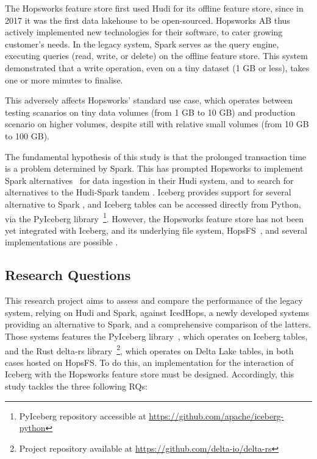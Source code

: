 The Hopsworks feature store \cite{10.1145/3626246.3653389} first used Hudi for its offline feature store, since in 2017 it was the first data lakehouse to be open-sourced. Hopsworks AB thus actively implemented new technologies for their software, to cater growing customer's needs. In the legacy system, Spark serves as the query engine, executing queries (read, write, or delete) on the offline feature store. This system demonstrated that a write operation, even on a tiny dataset (1 GB or less), takes one or more minutes to finalise.

This adversely affects Hopsworks' standard use case, which operates between testing scanarios on tiny data volumes (from 1 GB to 10 GB) and production scenario on higher volumes, despite still with relative small volumes (from 10 GB to 100 GB).

The fundamental hypothesis of this study is that the prolonged transaction time is a problem determined by Spark. This has prompted Hopsworks to implement Spark alternatives~\cite{Khazanchi1801362} for data ingestion in their Hudi system, and to search for alternatives to the Hudi-Spark tandem \cite{manfrediReducingReadWrite2024}.
Iceberg provides support for several alternative to Spark \cite{OngoingEvolutionTableFormat}, and Iceberg tables can be accessed directly from Python, via the PyIceberg library~\footnote{PyIceberg repository accessible at \url{https://github.com/apache/iceberg-python}}.
However, the Hopsworks feature store has not been yet integrated with Iceberg, and its underlying file system, \gls{HopsFS}~\cite{niaziHopsFSScalingHierarchical2017}, and several implementations are possible \cite{shiranApacheIcebergDefinitive2024}.


\subsection{Research Questions} 
\label{subsec:research_questions}

This research project aims to assess and compare the performance of the legacy system, relying on Hudi and Spark, against IcedHops, a newly developed systems providing an alternative to Spark, and a comprehensive comparison of the latters. Those systems features the PyIceberg library~\footnotemark[\value{footnote}], which operates on Iceberg tables, and the Rust delta-rs library~\footnote{Project repository available at \url{https://github.com/delta-io/delta-rs}}, which operates on Delta Lake tables, in both cases hosted on \gls{HopsFS}. To do this, an implementation for the interaction of Iceberg with the Hopsworks feature store must be designed. Accordingly, this study tackles the three following \glspl{RQ}:

